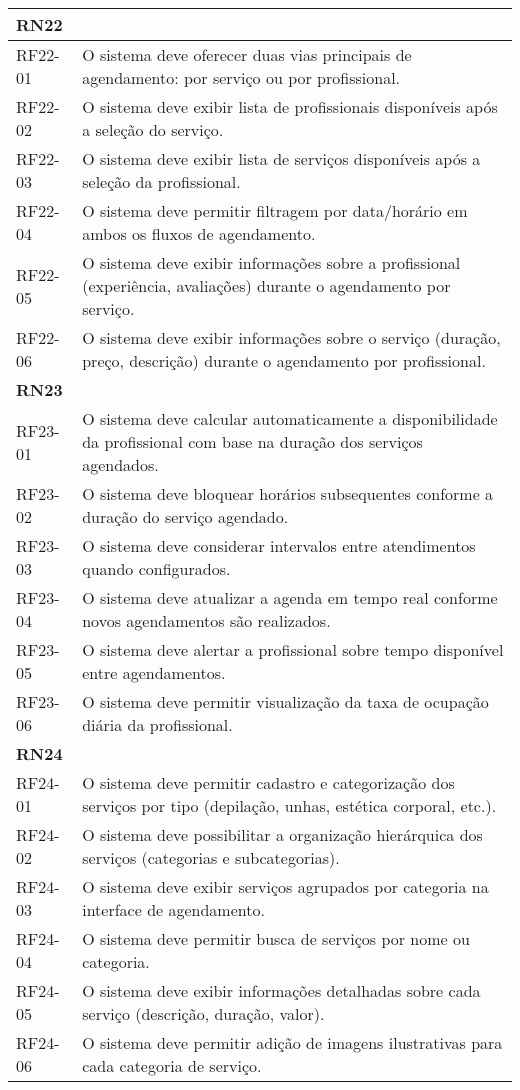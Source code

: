 \begin{longtable}{|p{}|p{}|}
	\multicolumn{2}{|l|}{\textbf{RN22}} \\ \hline
	RF22-01 & O sistema deve oferecer duas vias principais de agendamento: por serviço ou por profissional. \\ \hline
	RF22-02 & O sistema deve exibir lista de profissionais disponíveis após a seleção do serviço. \\ \hline
	RF22-03 & O sistema deve exibir lista de serviços disponíveis após a seleção da profissional. \\ \hline
	RF22-04 & O sistema deve permitir filtragem por data/horário em ambos os fluxos de agendamento. \\ \hline
	RF22-05 & O sistema deve exibir informações sobre a profissional (experiência, avaliações) durante o agendamento por serviço. \\ \hline
	RF22-06 & O sistema deve exibir informações sobre o serviço (duração, preço, descrição) durante o agendamento por profissional. \\ \hline
	
	\multicolumn{2}{|l|}{\textbf{RN23}} \\ \hline
	RF23-01 & O sistema deve calcular automaticamente a disponibilidade da profissional com base na duração dos serviços agendados. \\ \hline
	RF23-02 & O sistema deve bloquear horários subsequentes conforme a duração do serviço agendado. \\ \hline
	RF23-03 & O sistema deve considerar intervalos entre atendimentos quando configurados. \\ \hline
	RF23-04 & O sistema deve atualizar a agenda em tempo real conforme novos agendamentos são realizados. \\ \hline
	RF23-05 & O sistema deve alertar a profissional sobre tempo disponível entre agendamentos. \\ \hline
	RF23-06 & O sistema deve permitir visualização da taxa de ocupação diária da profissional. \\ \hline
	
	\multicolumn{2}{|l|}{\textbf{RN24}} \\ \hline
	RF24-01 & O sistema deve permitir cadastro e categorização dos serviços por tipo (depilação, unhas, estética corporal, etc.). \\ \hline
	RF24-02 & O sistema deve possibilitar a organização hierárquica dos serviços (categorias e subcategorias). \\ \hline
	RF24-03 & O sistema deve exibir serviços agrupados por categoria na interface de agendamento. \\ \hline
	RF24-04 & O sistema deve permitir busca de serviços por nome ou categoria. \\ \hline
	RF24-05 & O sistema deve exibir informações detalhadas sobre cada serviço (descrição, duração, valor). \\ \hline
	RF24-06 & O sistema deve permitir adição de imagens ilustrativas para cada categoria de serviço. \\ \hline
	

\end{longtable}
